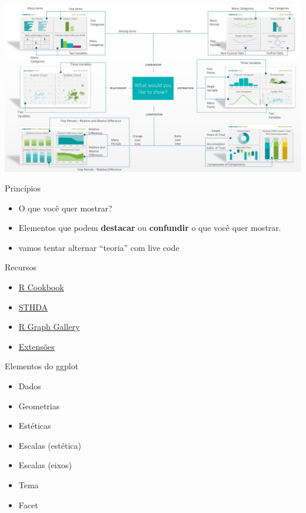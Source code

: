 \documentclass[
  9pt,
  ignorenonframetext,
]{beamer}
\begin{document}
\begin{frame}{}
\protect\hypertarget{section-3}{}
\href{https://www.techprevue.com/decision-tree-perfect-visualisation-data/}{\includegraphics{imgs/abela-chart-chooser.jpg}}
\end{frame}

\begin{frame}{Princípios}
\protect\hypertarget{princuxedpios}{}
\begin{itemize}
\item
  O que você quer mostrar?
\item
  Elementos que podem \textbf{destacar} ou \textbf{confundir} o que você
  quer mostrar.
\item
  vamos tentar alternar ``teoria'' com live code
\end{itemize}
\end{frame}

\begin{frame}{Recursos}
\protect\hypertarget{recursos}{}
\begin{itemize}
\item
  \href{http://www.cookbook-r.com/Graphs/}{R Cookbook}
\item
  \href{http://www.sthda.com/english/wiki/be-awesome-in-ggplot2-a-practical-guide-to-be-highly-effective-r-software-and-data-visualization}{STHDA}
\item
  \href{https://www.r-graph-gallery.com/}{R Graph Gallery}
\item
  \href{http://www.ggplot2-exts.org/}{Extensões}
\end{itemize}
\end{frame}

\begin{frame}{Elementos do ggplot}
\protect\hypertarget{elementos-do-ggplot}{}
\begin{itemize}
\item
  Dados
\item
  Geometrias
\item
  Estéticas
\item
  Escalas (estética)
\item
  Escalas (eixos)
\item
  Tema
\item
  Facet
\end{itemize}
\end{frame}
\end{document}
